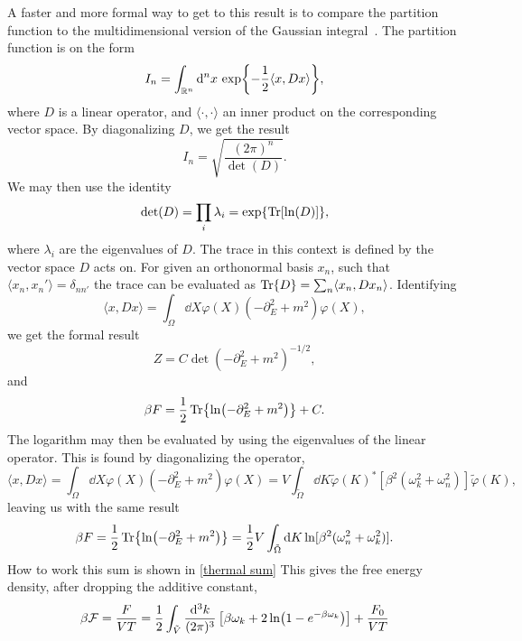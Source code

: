 A faster and more formal way to get to this result is to compare the partition function to the multidimensional version of the Gaussian integral~\cite{Kapusta:finiteTemp, Peskin:IntroQFT}.
The partition function is on the form 
\begin{equation*}
    I_n = \int_{\mathbb{R}^n} \dd^n x\, \exp{- \frac{1}{2} \langle x, D x\rangle },
\end{equation*}
where $D$ is a linear operator, and $\langle \cdot , \cdot \rangle$ an inner product on the corresponding vector space.
By diagonalizing $D$, we get the result
\begin{equation*}
    I_n = \sqrt{\frac{(2 \pi)^n}{\det(D)}}.
\end{equation*}
We may then use the identity
\begin{equation}
    \det(D) = \prod_i \lambda_i = \exp{\Tr[\ln(D)]},
\end{equation}
where $\lambda_i$ are the eigenvalues of $D$.
The trace in this context is defined by the vector space $D$ acts on.
For given an orthonormal basis $x_n$, such that $\langle x_n, x_n'\rangle = \delta_{nn'}$ the trace can be evaluated as $\Tr{D} = \sum_n \langle x_n, D x_n \rangle$.
Identifying 
\begin{equation*}
    \langle x, D x\rangle = \int_\Omega \dd X \varphi(X)\left(-\partial_E^2+m^2\right)\varphi(X),
\end{equation*}
we get the formal result
\begin{equation*}
    Z = C\det(-\partial_E^2 + m^2)^{-1/2},
\end{equation*}
and 
\begin{equation*}
    \beta F = \frac{1}{2}\Tr{\ln(-\partial_E^2 + m^2)} + C.
\end{equation*}
The logarithm may then be evaluated by using the eigenvalues of the linear operator.
This is found by diagonalizing the operator,
\begin{equation*}
    \langle x, D x \rangle 
    = \int_\Omega \dd X \varphi(X)\left(-\partial_E^2+m^2\right)\varphi(X)
    = V  \int_{\tilde \Omega} \dd K 
    \tilde \varphi(K)^* [\beta^2(\omega_k^2 +\omega_n^2)] \tilde \varphi(K),
\end{equation*}
leaving us with the same result
\begin{equation*}
    \beta F 
    = \frac{1}{2} \Tr{\ln(-\partial_E^2 + m^2)} 
    = \frac{1}{2} V \int_{\tilde \Omega} \dd K \ln[\beta^2(\omega_n^2 + \omega_k^2)].
\end{equation*}
How to work this sum is shown in \autoref{thermal sum}
This gives the free energy density, after dropping the additive constant,
\begin{equation}
    \label{free scalar free enrgy}
    \beta \mathcal{F} = \frac{F}{VT}
    = \frac{1}{2} \int_{\tilde V} \frac{\dd^3 k}{(2 \pi)^3}
    \left[
        \beta \omega_k + 2\ln(1 - e^{-\beta\omega_k})
    \right] + \frac{F_0}{VT}
\end{equation}

